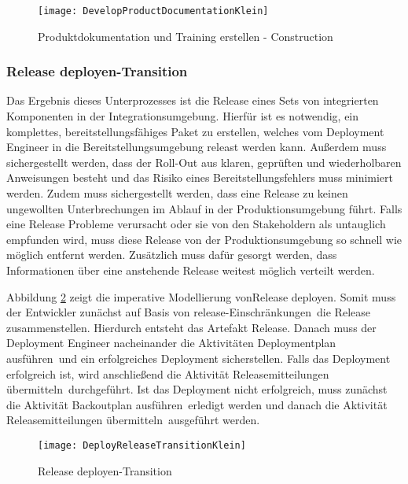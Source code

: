 \begin{figure}[!htbp]
\begin{center}
  \texttt{[image: DevelopProductDocumentationKlein]} %
  \caption{Produktdokumentation und Training erstellen - Construction}
  \label{fig:DevelopProductDocumentationKlein}
\end{center}
\end{figure}


\subsubsection{Release deployen-Transition}


Das Ergebnis dieses Unterprozesses ist die Release eines Sets von integrierten Komponenten in der Integrationsumgebung. Hierfür ist es notwendig, ein komplettes, bereitstellungsfähiges Paket zu erstellen, welches vom Deployment Engineer in die Bereitstellungsumgebung releast werden kann.
 Außerdem muss sichergestellt werden, dass der Roll-Out aus klaren, geprüften und wiederholbaren Anweisungen besteht und das Risiko eines Bereitstellungsfehlers muss minimiert werden.
 Zudem muss sichergestellt werden, dass eine Release zu keinen ungewollten Unterbrechungen im Ablauf in der Produktionsumgebung führt. Falls eine Release Probleme verursacht oder sie von den Stakeholdern als untauglich empfunden wird, muss diese Release von der Produktionsumgebung so schnell wie möglich entfernt werden. Zusätzlich muss dafür gesorgt werden, dass Informationen über eine anstehende Release weitest möglich verteilt werden.\newline
 
  Abbildung \ref{fig:DeployReleaseTransitionKlein} zeigt die imperative Modellierung von\grqq Release deployen\grqq.
  Somit muss der Entwickler zunächst auf Basis von \grqq release-Einschränkungen\grqq \ die \grqq Release zusammenstellen\grqq. Hierdurch entsteht das Artefakt \grqq Release\grqq. Danach muss der Deployment Engineer nacheinander die Aktivitäten \grqq Deploymentplan ausführen\grqq \ und ein \grqq erfolgreiches Deployment sicherstellen\grqq. Falls das Deployment erfolgreich ist, wird anschließend die Aktivität \grqq Releasemitteilungen übermitteln\grqq \ durchgeführt. Ist das Deployment nicht erfolgreich, muss zunächst die Aktivität \grqq Backoutplan ausführen\grqq \ erledigt werden und danach die Aktivität \grqq Releasemitteilungen übermitteln\grqq \ ausgeführt werden.


\begin{figure}[!htbp]
\begin{center}
  \texttt{[image: DeployReleaseTransitionKlein]} %
  \caption{Release deployen-Transition}
  \label{fig:DeployReleaseTransitionKlein}
\end{center}
\end{figure}



